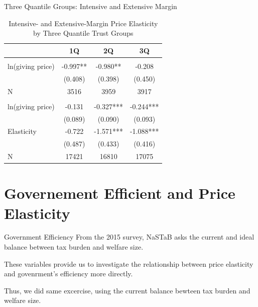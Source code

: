 \documentclass[
  ignorenonframetext,
]{beamer}
\begin{document}
\begin{frame}{Three Quantile Groups: Intensive and Extensive Margin}
\protect\hypertarget{three-quantile-groups-intensive-and-extensive-margin}{}
\begin{table}

\caption{\label{tab:kableEstimateElasticityIntExtByTrustGroup3}Intensive- and Extensive-Margin Price Elasticity by Three Quantile Trust Groups}
\centering
\begin{tabular}[t]{lccc}
\toprule
 & 1Q & 2Q & 3Q\\
\midrule
\addlinespace[0.3em]
\multicolumn{4}{l}{\textbf{Intensive Margin}}\\
\hspace{1em}ln(giving price) & -0.997** & -0.980** & -0.208\\
\hspace{1em} & (0.408) & (0.398) & (0.450)\\
\hspace{1em}N & 3516 & 3959 & 3917\\
\addlinespace[0.3em]
\multicolumn{4}{l}{\textbf{Extensive Margin}}\\
\hspace{1em}ln(giving price) & -0.131 & -0.327*** & -0.244***\\
\hspace{1em} & (0.089) & (0.090) & (0.093)\\
\hspace{1em}Elasticity & -0.722 & -1.571*** & -1.088***\\
\hspace{1em} & (0.487) & (0.433) & (0.416)\\
\hspace{1em}N & 17421 & 16810 & 17075\\
\bottomrule
\end{tabular}
\end{table}
\end{frame}

\hypertarget{governement-efficient-and-price-elasticity}{%
\section{Governement Efficient and Price
Elasticity}\label{governement-efficient-and-price-elasticity}}

\begin{frame}{Government Efficiency}
\protect\hypertarget{government-efficiency}{}
From the 2015 survey, NaSTaB asks the current and ideal balance between
tax burden and welfare size.

These variables provide us to investigate the relationship between price
elasticity and govenrment's efficiency more directly.

Thus, we did same excercise, using the current balance bewteen tax
burden and welfare size.
\end{frame}
\end{document}
